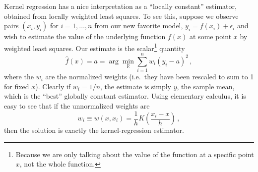 \documentclass[11pt]{article}
\begin{document}
Kernel regression has a nice interpretation as a ``locally constant'' estimator, obtained from locally weighted least squares.  To see this, suppose we observe pairs $(x_i, y_i)$ for $i = 1, \ldots, n$ from our new favorite model, $y_i = f(x_i) + \epsilon_i$ and wish to estimate the value of the underlying function $f(x)$ at some point $x$ by weighted least squares.  Our estimate is the scalar\footnote{Because we are only talking about the value of the function at a specific point $x$, not the whole function.} quantity
$$
\hat{f}(x) = a = \arg \min_{\mathbb{R}} \sum_{i=1}^n w_i (y_i - a)^2 \, ,
$$
where the $w_i$ are the normalized weights (i.e.~they have been rescaled to sum to 1 for fixed $x$).  Clearly if $w_i = 1/n$, the estimate is simply $\bar{y}$, the sample mean, which is the ``best'' globally constant estimator.  Using elementary calculus, it is easy to see that if the unnormalized weights are
$$
w_i \equiv w(x, x_i) = \frac{1}{h} K \left( \frac{x_i - x}{h} \right)  \, ,
$$
then the solution is exactly the kernel-regression estimator.
\end{document}

